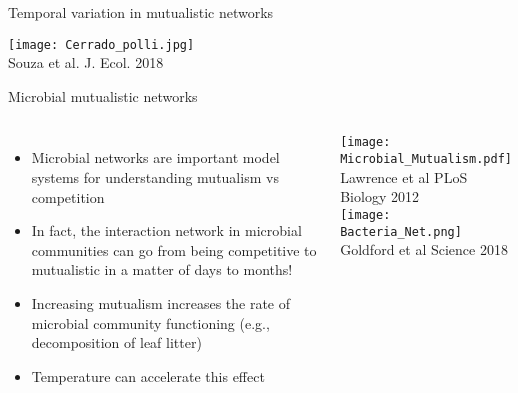 \begin{frame}{Temporal variation in mutualistic networks}
  
  \begin{center}
    \texttt{[image: Cerrado\_polli.jpg]}\\ \tiny Souza et al. J. Ecol. 2018  
  \end{center}
  \end{frame}

\begin{frame}{Microbial mutualistic networks}
  
  \begin{columns}[c]
      \begin{itemize}[<+->]\setlength{\itemindent}{0em}\itemsep3pt
        \item Microbial networks are important model systems for understanding mutualism vs competition   
        \item In fact, the interaction network in microbial communities can go from being competitive to mutualistic in a matter of days to months! 
        \item Increasing mutualism increases the rate of microbial community functioning (e.g., decomposition of leaf litter)
        \item Temperature can accelerate this effect\footnotemark
      \end{itemize}
    \centering
    \texttt{[image: Microbial\_Mutualism.pdf]}\\
    \vspace{-6pt}
    {\tiny Lawrence et al PLoS Biology 2012}\\
    \texttt{[image: Bacteria\_Net.png]}\\
    \vspace{-6pt}
    {\tiny Goldford et al Science 2018}
 
  \end{columns}


\end{frame}
